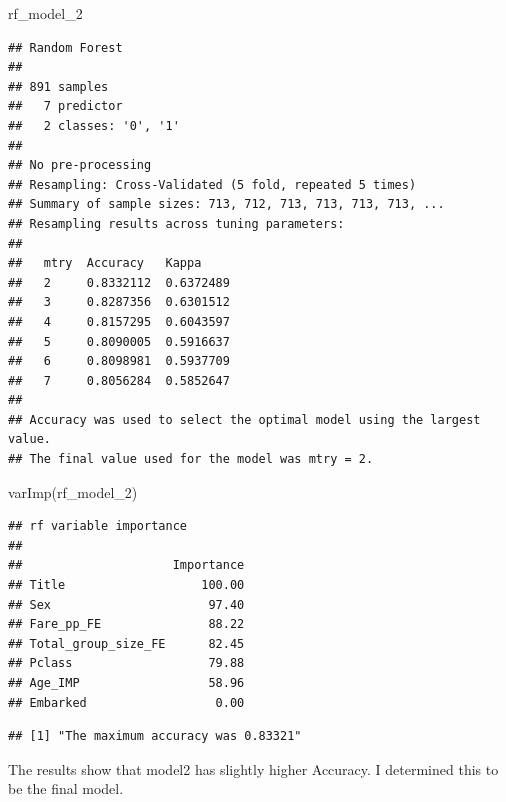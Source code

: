 \documentclass[
]{article}
\newenvironment{Shaded}{\begin{snugshade}}{\end{snugshade}}
\newcommand{\DecValTok}[1]{\textcolor[rgb]{0.00,0.00,0.81}{#1}}
\newcommand{\FunctionTok}[1]{\textcolor[rgb]{0.00,0.00,0.00}{#1}}
\newcommand{\NormalTok}[1]{#1}
\newcommand{\SpecialCharTok}[1]{\textcolor[rgb]{0.00,0.00,0.00}{#1}}
\newcommand{\StringTok}[1]{\textcolor[rgb]{0.31,0.60,0.02}{#1}}
\begin{document}
\begin{Shaded}
\begin{Highlighting}[]
\NormalTok{rf\_model\_2}
\end{Highlighting}
\end{Shaded}

\begin{verbatim}
## Random Forest 
## 
## 891 samples
##   7 predictor
##   2 classes: '0', '1' 
## 
## No pre-processing
## Resampling: Cross-Validated (5 fold, repeated 5 times) 
## Summary of sample sizes: 713, 712, 713, 713, 713, 713, ... 
## Resampling results across tuning parameters:
## 
##   mtry  Accuracy   Kappa    
##   2     0.8332112  0.6372489
##   3     0.8287356  0.6301512
##   4     0.8157295  0.6043597
##   5     0.8090005  0.5916637
##   6     0.8098981  0.5937709
##   7     0.8056284  0.5852647
## 
## Accuracy was used to select the optimal model using the largest value.
## The final value used for the model was mtry = 2.
\end{verbatim}

\begin{Shaded}
\begin{Highlighting}[]
\FunctionTok{varImp}\NormalTok{(rf\_model\_2)}
\end{Highlighting}
\end{Shaded}

\begin{verbatim}
## rf variable importance
## 
##                     Importance
## Title                   100.00
## Sex                      97.40
## Fare_pp_FE               88.22
## Total_group_size_FE      82.45
## Pclass                   79.88
## Age_IMP                  58.96
## Embarked                  0.00
\end{verbatim}

\begin{Shaded}
\end{Shaded}

\begin{verbatim}
## [1] "The maximum accuracy was 0.83321"
\end{verbatim}

The results show that model2 has slightly higher Accuracy. I determined
this to be the final model.
\end{document}
